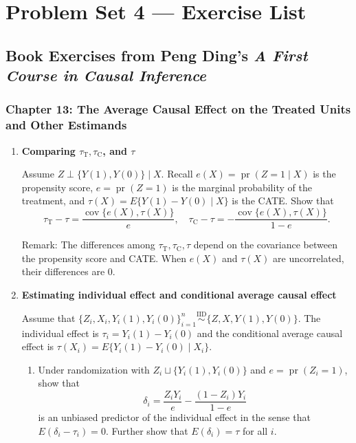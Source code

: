 \documentclass[11pt]{article}
\begin{document}
\section*{Problem Set 4 --- Exercise List}

\subsection*{Book Exercises from Peng Ding's \textit{A First Course in Causal Inference}}

\subsubsection*{Chapter 13: The Average Causal Effect on the Treated Units and Other Estimands}

\begin{enumerate}[label=\textbf{13.\arabic*}]

\item[\textbf{13.1}] \textbf{Comparing $\tau_{\mathrm{T}},\tau_{\mathrm{C}}$, and $\tau$}

Assume $Z \perp \{Y(1), Y(0)\} \mid X$. Recall $e(X) = \operatorname{pr}(Z = 1 \mid X)$ is the propensity score, $e = \operatorname{pr}(Z = 1)$ is the marginal probability of the treatment, and $\tau(X) = E\{Y(1) - Y(0) \mid X\}$ is the CATE. Show that
\[
\tau_{\mathrm{T}} - \tau = \frac{\operatorname{cov}\{e(X), \tau(X)\}}{e}, \quad \tau_{\mathrm{C}} - \tau = - \frac{\operatorname{cov}\{e(X), \tau(X)\}}{1 - e}.
\]

Remark: The differences among $\tau_{\mathrm{T}}, \tau_{\mathrm{C}}, \tau$ depend on the covariance between the propensity score and CATE. When $e(X)$ and $\tau(X)$ are uncorrelated, their differences are 0.

\item[\textbf{13.6}] \textbf{Estimating individual effect and conditional average causal effect}

Assume that $\{Z_i, X_i, Y_i(1), Y_i(0)\}_{i=1}^n \stackrel{\text{IID}}{\sim} \{Z, X, Y(1), Y(0)\}$. The individual effect is $\tau_i = Y_i(1) - Y_i(0)$ and the conditional average causal effect is $\tau(X_i) = E\{Y_i(1) - Y_i(0) \mid X_i\}$.

\begin{enumerate}
\item Under randomization with $Z_{i} \sqcup \{Y_{i}(1), Y_{i}(0)\}$ and $e = \operatorname{pr}(Z_{i} = 1)$, show that
\[
\delta_{i} = \frac{Z_{i} Y_{i}}{e} - \frac{(1 - Z_{i}) Y_{i}}{1 - e}
\]
is an unbiased predictor of the individual effect in the sense that $E(\delta_{i} - \tau_{i}) = 0$. Further show that $E(\delta_i) = \tau$ for all $i$.


\end{enumerate}
\end{enumerate}
\end{document}
